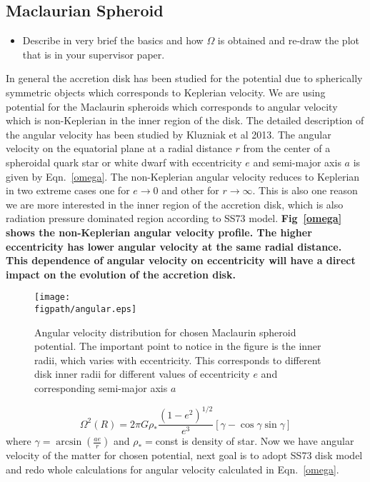 \documentclass[useAMS,usenatbib]{mn2e}
\newcommand{\figpath}{./Figs/}
\begin{document}
\subsection{Maclaurian Spheroid}
\begin{itemize}
\item Describe in very brief the basics and how $\Omega$ is obtained
  and re-draw the plot that is in your supervisor paper. 
\end{itemize}
In general the accretion disk has been studied for the potential due to spherically symmetric objects which corresponds to Keplerian velocity. We are using potential for the Maclaurin spheroids which corresponds to angular velocity which is non-Keplerian in the inner region of the disk. The detailed description of the angular velocity has been studied by Kluzniak et al 2013. The angular velocity on the equatorial plane at a radial distance $r$ from the center of a spheroidal quark star or white dwarf with eccentricity $e$ and semi-major axis $a$ is given by Eqn.~\ref{omega}. The non-Keplerian angular velocity reduces to Keplerian in two extreme cases one for $e\rightarrow 0$ and other for $r\rightarrow \infty$. This is also one reason we are more interested in the inner region of the accretion disk, which is also radiation pressure dominated region according to SS73 model. \textbf{Fig~\ref{omega} shows the non-Keplerian angular velocity profile. The higher eccentricity has lower angular velocity at the same radial distance. This dependence of angular velocity on eccentricity will have a direct impact on the evolution of the accretion disk.}
\begin{figure}
\centering
\texttt{[image: \\figpath/angular.eps]}
\caption{Angular velocity distribution for chosen Maclaurin spheroid potential. The important point to notice in the figure is the inner radii, which varies with eccentricity. This corresponds to different disk inner radii for different values of eccentricity $e$ and corresponding semi-major axis $a$}
\label{fig:steadyplt1}
\end{figure}
\begin{equation}
\Omega ^2 \left(R\right)= 2\pi G\rho_* \frac{(1-e^2)^{1/2}}{e^3}\left[\gamma - \cos \gamma \sin\gamma \right]
\label{omega}
\end{equation}  
where $\gamma = \arcsin (\frac{a e}{r})$ and $\rho_* =$const is density of star. Now we have angular velocity of the matter for chosen potential, next goal is to adopt SS73 disk model and redo whole calculations for angular velocity calculated in Eqn.~\ref{omega}.
\end{document}
